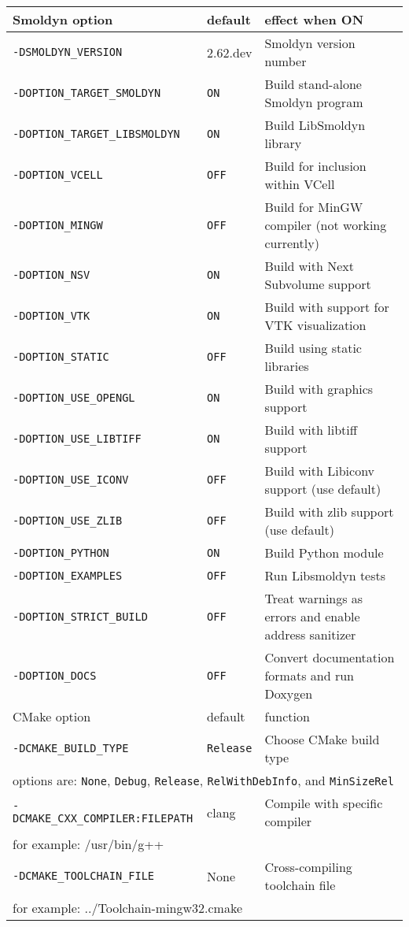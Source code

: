 \documentclass {scrbook}
\newcommand {\ttt} {\texttt}
\begin{document}
\begin{longtable}[c]{lll}
Smoldyn option & default & effect when ON\\
\hline
\ttt{-DSMOLDYN\_VERSION} & 2.62.dev & Smoldyn version number\\
\ttt{-DOPTION\_TARGET\_SMOLDYN} & \ttt{ON} & Build stand-alone Smoldyn program\\
\ttt{-DOPTION\_TARGET\_LIBSMOLDYN} & \ttt{ON} & Build LibSmoldyn library\\
\ttt{-DOPTION\_VCELL} & \ttt{OFF} & Build for inclusion within VCell\\
\ttt{-DOPTION\_MINGW} & \ttt{OFF} & Build for MinGW compiler (not working currently)\\
\ttt{-DOPTION\_NSV} & \ttt{ON} & Build with Next Subvolume support\\
\ttt{-DOPTION\_VTK} & \ttt{ON} & Build with support for VTK visualization\\
\ttt{-DOPTION\_STATIC} & \ttt{OFF} & Build using static libraries\\
\ttt{-DOPTION\_USE\_OPENGL} & \ttt{ON} & Build with graphics support\\
\ttt{-DOPTION\_USE\_LIBTIFF} & \ttt{ON} & Build with libtiff support\\
\ttt{-DOPTION\_USE\_ICONV} & \ttt{OFF} & Build with Libiconv support (use default)\\
\ttt{-DOPTION\_USE\_ZLIB} & \ttt{OFF} & Build with zlib support (use default)\\
\ttt{-DOPTION\_PYTHON} & \ttt{ON} & Build Python module\\
\ttt{-DOPTION\_EXAMPLES} & \ttt{OFF} & Run Libsmoldyn tests\\
\ttt{-DOPTION\_STRICT\_BUILD} & \ttt{OFF} & Treat warnings as errors and enable address sanitizer\\
\ttt{-DOPTION\_DOCS} & \ttt{OFF} & Convert documentation formats and run Doxygen\\
\hline
CMake option & default & function\\
\hline
\ttt{-DCMAKE\_BUILD\_TYPE} & \ttt{Release} & Choose CMake build type\\
\multicolumn{3}{l}{\hspace{0.3in}options are: \ttt{None}, \ttt{Debug}, \ttt{Release}, \ttt{RelWithDebInfo}, and \ttt{MinSizeRel}}\\
\ttt{-DCMAKE\_CXX\_COMPILER:FILEPATH} & clang & Compile with specific compiler\\
\multicolumn{3}{l}{\hspace{0.3in}for example: /usr/bin/g++}\\
\ttt{-DCMAKE\_TOOLCHAIN\_FILE} & None & Cross-compiling toolchain file \\
\multicolumn{3}{l}{\hspace{0.3in}for example: ../Toolchain-mingw32.cmake}\\
\end{longtable}
\end{document}
